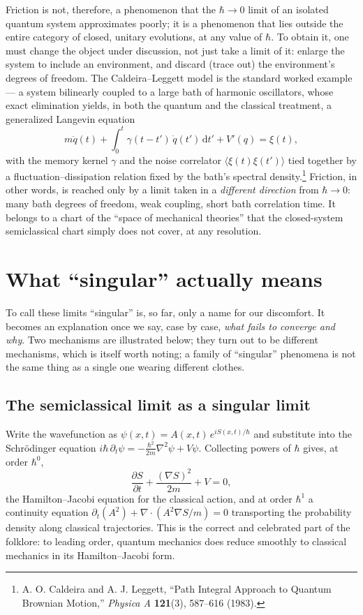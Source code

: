 \documentclass[11pt]{book}
\newcommand{\dd}{\mathrm{d}}
\newcommand{\pdv}[2]{\dfrac{\partial #1}{\partial #2}}
\begin{document}
Friction is not, therefore, a phenomenon that the $\hbar\to 0$ limit of an isolated quantum system approximates poorly; it is a phenomenon that lies outside the entire category of closed, unitary evolutions, at any value of $\hbar$. To obtain it, one must change the object under discussion, not just take a limit of it: enlarge the system to include an environment, and discard (trace out) the environment's degrees of freedom. The Caldeira--Leggett model is the standard worked example --- a system bilinearly coupled to a large bath of harmonic oscillators, whose exact elimination yields, in both the quantum and the classical treatment, a generalized Langevin equation
\begin{equation}
m\ddot q(t) + \int_0^t \gamma(t-t')\,\dot q(t')\,\dd t' + V'(q) = \xi(t),
\end{equation}
with the memory kernel $\gamma$ and the noise correlator $\langle \xi(t)\xi(t')\rangle$ tied together by a fluctuation--dissipation relation fixed by the bath's spectral density.\footnote{A. O. Caldeira and A. J. Leggett, ``Path Integral Approach to Quantum Brownian Motion,'' \emph{Physica A} \textbf{121}(3), 587--616 (1983).} Friction, in other words, is reached only by a limit taken in a \emph{different direction} from $\hbar\to 0$: many bath degrees of freedom, weak coupling, short bath correlation time. It belongs to a chart of the ``space of mechanical theories'' that the closed-system semiclassical chart simply does not cover, at any resolution.

\section{What ``singular'' actually means}
\label{sec:singular}

To call these limits ``singular'' is, so far, only a name for our discomfort. It becomes an explanation once we say, case by case, \emph{what fails to converge and why}. Two mechanisms are illustrated below; they turn out to be different mechanisms, which is itself worth noting; a family of ``singular'' phenomena is not the same thing as a single one wearing different clothes.

\subsection{The semiclassical limit as a singular limit}
\label{sec:wkb}

Write the wavefunction as $\psi(x,t) = A(x,t)\,e^{iS(x,t)/\hbar}$ and substitute into the Schr\"odinger equation $i\hbar\,\partial_t\psi = -\tfrac{\hbar^2}{2m}\nabla^2\psi + V\psi$. Collecting powers of $\hbar$ gives, at order $\hbar^0$,
\begin{equation}
\pdv{S}{t} + \frac{(\nabla S)^2}{2m} + V = 0,
\end{equation}
the Hamilton--Jacobi equation for the classical action, and at order $\hbar^1$ a continuity equation $\partial_t(A^2) + \nabla\!\cdot(A^2\nabla S/m) = 0$ transporting the probability density along classical trajectories. This is the correct and celebrated part of the folklore: to leading order, quantum mechanics does reduce smoothly to classical mechanics in its Hamilton--Jacobi form.
\end{document}
